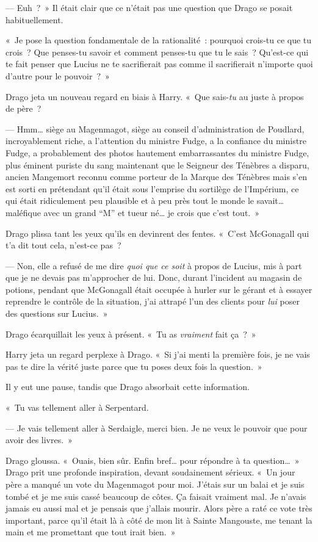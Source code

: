 --- Euh~?~» Il était clair que ce n'était pas une question que Drago se posait habituellement.

«~Je pose la question fondamentale de la rationalité~: pourquoi crois-tu ce que tu crois~?
Que penses-tu savoir et comment penses-tu que tu le sais~?
Qu'est-ce qui te fait penser que Lucius ne te sacrifierait pas comme il sacrifierait n'importe quoi d'autre pour le pouvoir~?~»

Drago jeta un nouveau regard en biais à Harry.  «~Que sais-\emph{tu} au juste à propos de père~?

--- Hmm… siège au Magenmagot, siège au conseil d'administration de Poudlard, incroyablement riche, a l'attention du ministre Fudge, a la confiance du ministre Fudge, a probablement des photos hautement embarrassantes du ministre Fudge, plus éminent puriste du sang maintenant que le Seigneur des Ténèbres a disparu, ancien Mangemort reconnu comme porteur de la Marque des Ténèbres mais s'en est sorti en prétendant qu'il était sous l'emprise du sortilège de l'Impérium, ce qui était ridiculement peu plausible et à peu près tout le monde le savait… maléfique avec un grand “M” et tueur né… je crois que c'est tout.~»

Drago plissa tant les yeux qu'ils en devinrent des fentes.
«~C'est McGonagall qui t'a dit tout cela, n'est-ce pas~?

--- Non, elle a refusé de me dire \emph{quoi que ce soit} à propos de Lucius, mis à part que je ne devais pas m'approcher de lui.
Donc, durant l'incident au magasin de potions, pendant que McGonagall était occupée à hurler sur le gérant et à essayer reprendre le contrôle de la situation, j'ai attrapé l'un des clients pour \emph{lui} poser des questions sur Lucius.~»

Drago écarquillait les yeux à présent. «~Tu as \emph{vraiment} fait ça~?~»

Harry jeta un regard perplexe à Drago. «~Si j'ai menti la première fois, je ne vais pas te dire la vérité juste parce que tu poses deux fois la question.~»

Il y eut une pause, tandis que Drago absorbait cette information.

«~Tu vas tellement aller à Serpentard.

--- Je vais tellement aller à Serdaigle, merci bien. Je ne veux le pouvoir que pour avoir des livres.~»

Drago gloussa. «~Ouais, bien sûr. Enfin bref… pour répondre à ta question…~»
Drago prit une profonde inspiration, devant soudainement sérieux.
«~Un jour père a manqué un vote du Magenmagot pour moi.
J'étais sur un balai et je suis tombé et je me suis cassé beaucoup de côtes.
Ça faisait vraiment mal.
Je n'avais jamais eu aussi mal et je pensais que j'allais mourir.
Alors père a raté ce vote très important, parce qu'il était là à côté de mon lit à Sainte Mangouste, me tenant la main et me promettant que tout irait bien.~»

